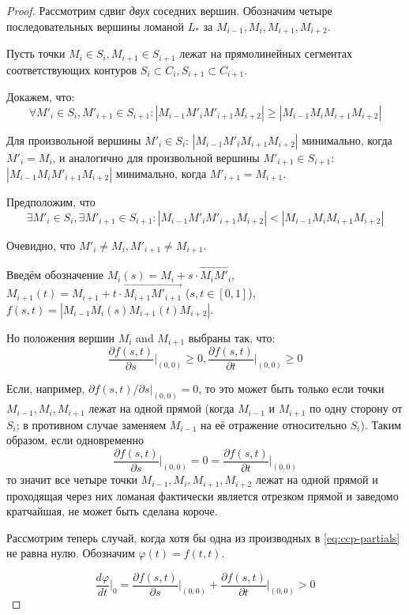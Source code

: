 \begin{proof}
Рассмотрим сдвиг
\textit{двух}
соседних вершин.
Обозначим четыре последовательных вершины ломаной
$L_*$
за
$M_{i-1}, M_i, M_{i+1}, M_{i+2}$.

Пусть точки
$M_i \in S_i,
M_{i+1} \in S_{i+1}$
лежат на прямолинейных сегментах
соответствующих контуров
$S_i \subset C_i,
S_{i+1} \subset C_{i+1}$.

Докажем, что:
$$
\forall M'_i \in S_i,
M'_{i+1} \in S_{i+1}
:
|M_{i-1} M'_i M'_{i+1} M_{i+2}|
\geqslant
|M_{i-1} M_i M_{i+1} M_{i+2}|
$$

Для произвольной вершины
$M'_i \in S_i$:
$|M_{i-1} M'_i M_{i+1} M_{i+2}|$
минимально, когда
$M'_i=M_i$,
и аналогично
для произвольной вершины
$M'_{i+1} \in S_{i+1}$:
$|M_{i-1} M_i M'_{i+1} M_{i+2}|$
минимально, когда
$M'_{i+1}=M_{i+1}$.

Предположим, что
$$
\exists M'_i \in S_i,
\exists M'_{i+1} \in S_{i+1}
:
|M_{i-1} M'_i M'_{i+1} M_{i+2}|
<
|M_{i-1} M_i M_{i+1} M_{i+2}|
$$

Очевидно, что
$
M'_i \ne M_i,
M'_{i+1} \ne M_{i+1}
$.

Введём обозначение
$
M_i(s)=M_i+s \cdot \overrightarrow{M_i M'_i}
$,
$
  M_{i+1}(t)= M_{i+1}+t \cdot \overrightarrow{M_{i+1} M'_{i+1}}
$
($s,t \in[0,1]$),
$f(s,t)=
|M_{i-1} M_i(s) M_{i+1}(t) M_{i+2}|
$.

Но положения вершин
$M_i$ and $M_{i+1}$
выбраны так, что:
\begin{equation}
\label{eq:ccp-partials}
\frac{\partial f(s,t)}{\partial s} \Big|_{(0,0)} \geqslant 0,
\frac{\partial f(s,t)}{\partial t} \Big|_{(0,0)} \geqslant 0
\end{equation}

Если,
например,
$\partial f(s,t) / \partial s \big|_{(0,0)} = 0$,
то это может быть только если точки
$M_{i-1}, M_i, M_{i+1}$
лежат на одной прямой
(когда
$M_{i-1}$
и
$M_{i+1}$
по одну сторону от
$S_i$;
в противном случае
заменяем
$M_{i-1}$
на её отражение относительно
$S_i$).
Таким образом,
если одновременно
$$
\frac{\partial f(s,t)}{\partial s} \Big|_{(0,0)}
= 0 =
\frac{\partial f(s,t)}{\partial t} \Big|_{(0,0)}
$$
то значит все четыре точки
$M_{i-1}, M_i, M_{i+1}, M_{i+2}$
лежат на одной прямой
и проходящая через них ломаная
фактически является отрезком прямой
и заведомо кратчайшая,
не может быть сделана короче.

Рассмотрим теперь случай,
когда хотя бы одна из производных в
\eqref{eq:ccp-partials}
не равна нулю.
Обозначим
$\varphi(t)=f(t,t)$.

$$
\frac{d\varphi}{dt} \Big|_0 =
\frac{\partial f(s,t)}{\partial s} \Big|_{(0,0)}
+
\frac{\partial f(s,t)}{\partial t} \Big|_{(0,0)}
>0
$$


\end{proof}

